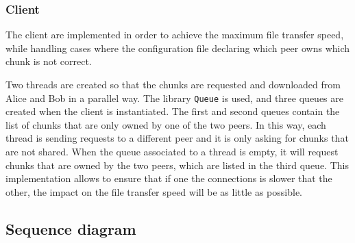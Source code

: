 \subsubsection{Client}

The client are implemented in order to achieve the maximum file transfer speed, while handling cases where the configuration file declaring which peer owns which chunk is not correct.

Two threads are created so that the chunks are requested and downloaded from Alice and Bob in a parallel way. The library \texttt{Queue} is used, and three queues are created when the client is instantiated. The first and second queues contain the list of chunks that are only owned by one of the two peers. In this way, each thread is sending requests to a different peer and it is only asking for chunks that are not shared. When the queue associated to a thread is empty, it will request chunks that are owned by the two peers, which are listed in the third queue. This implementation allows to ensure that if one the connections is slower that the other, the impact on the file transfer speed will be as little as possible.


\subsection{Sequence diagram}